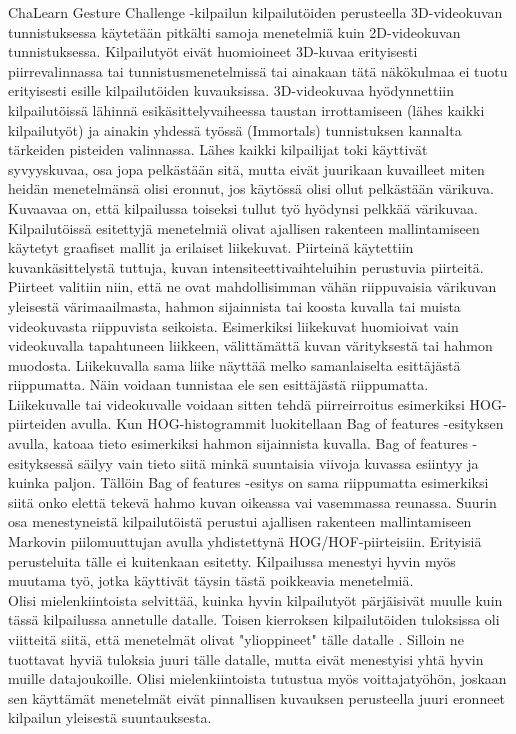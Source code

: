 ChaLearn Gesture Challenge -kilpailun kilpailutöiden perusteella 3D-videokuvan tunnistuksessa käytetään pitkälti samoja 
menetelmiä kuin 2D-videokuvan tunnistuksessa. Kilpailutyöt eivät huomioineet 3D-kuvaa erityisesti piirrevalinnassa tai tunnistusmenetelmissä 
tai ainakaan tätä näkökulmaa ei tuotu erityisesti esille kilpailutöiden kuvauksissa. 3D-videokuvaa hyödynnettiin kilpailutöissä lähinnä esikäsittelyvaiheessa taustan irrottamiseen 
(lähes kaikki kilpailutyöt) ja ainakin yhdessä työssä (Immortals) tunnistuksen kannalta tärkeiden pisteiden valinnassa. Lähes kaikki kilpailijat 
toki käyttivät syvyyskuvaa, osa jopa pelkästään sitä, mutta eivät juurikaan kuvailleet miten heidän menetelmänsä olisi eronnut, jos käytössä olisi ollut pelkästään värikuva.
Kuvaavaa on, että kilpailussa toiseksi tullut työ hyödynsi pelkkää värikuvaa.\\

Kilpailutöissä esitettyjä menetelmiä olivat ajallisen rakenteen mallintamiseen käytetyt graafiset mallit ja erilaiset liikekuvat. Piirteinä käytettiin 
kuvankäsittelystä tuttuja, kuvan intensiteettivaihteluihin perustuvia piirteitä. Piirteet valitiin niin, että ne ovat mahdollisimman vähän riippuvaisia
 värikuvan yleisestä värimaailmasta, hahmon sijainnista tai koosta kuvalla tai muista videokuvasta riippuvista seikoista. Esimerkiksi liikekuvat huomioivat 
vain videokuvalla tapahtuneen liikkeen, välittämättä kuvan värityksestä tai hahmon muodosta. Liikekuvalla sama liike näyttää melko samanlaiselta esittäjästä 
riippumatta. Näin voidaan tunnistaa ele sen esittäjästä riippumatta.\\

Liikekuvalle tai videokuvalle voidaan sitten tehdä piirreirroitus esimerkiksi 
HOG-piirteiden avulla. Kun HOG-histogrammit luokitellaan Bag of features -esityksen avulla, katoaa tieto esimerkiksi hahmon sijainnista kuvalla.
Bag of features -esityksessä säilyy vain tieto siitä minkä suuntaisia viivoja kuvassa esiintyy ja kuinka paljon. Tällöin Bag of features -esitys on sama
riippumatta esimerkiksi siitä onko elettä tekevä hahmo kuvan oikeassa vai vasemmassa reunassa. Suurin osa menestyneistä kilpailutöistä
perustui ajallisen rakenteen mallintamiseen Markovin piilomuuttujan avulla yhdistettynä HOG/HOF-piirteisiin. 
Erityisiä perusteluita tälle ei kuitenkaan esitetty. Kilpailussa menestyi hyvin myös muutama työ, jotka käyttivät täysin tästä poikkeavia menetelmiä.\\

Olisi mielenkiintoista selvittää, kuinka hyvin kilpailutyöt pärjäisivät muulle kuin tässä kilpailussa annetulle datalle. 
Toisen kierroksen kilpailutöiden tuloksissa oli viitteitä siitä, että menetelmät olivat "ylioppineet" tälle datalle \citep {chalearn2}. 
Silloin ne tuottavat hyviä tuloksia juuri tälle datalle, mutta eivät menestyisi yhtä hyvin muille datajoukoille. Olisi mielenkiintoista 
tutustua myös voittajatyöhön, joskaan sen käyttämät menetelmät eivät pinnallisen kuvauksen perusteella juuri eronneet kilpailun yleisestä suuntauksesta.\\

